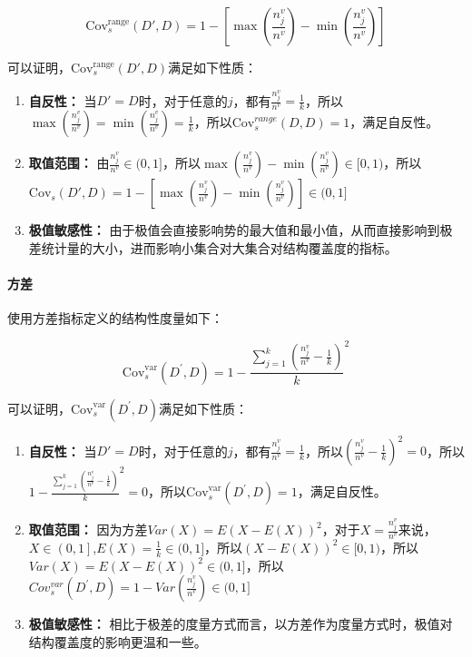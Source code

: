 \documentclass{../notes}
\newcommand{\Cov}{\text{Cov}}
\begin{document}
    \begin{equation}
        \Cov_s^{\text{range}}(D',D)=1-\left[\max\left(\frac{n_j^v}{n^v}\right)-\min\left(\frac{n_j^v}{n^v}\right)\right]
    \end{equation}

    可以证明，$\Cov_s^{\text{range}}(D',D)$满足如下性质：

    \begin{enumerate}
        \item \textbf{自反性：} 当$D' = D$时，对于任意的$j$，都有$\frac{n_j^v}{n^v}=\frac{1}{k}$，所以$\max{\left(\frac{n_j^v}{n^v}\right)}=\min(\frac{n_j^v}{n^v})=\frac{1}{k}$，所以$\Cov_s^{range}\left(D,D\right)=1$，满足自反性。
        \item \textbf{取值范围：} 由$\frac{n_j^v}{n^v}\in(0,1]$，所以$\max{\left(\frac{n_j^v}{n^v}\right)}-\min{\left(\frac{n_j^v}{n^v}\right)}\in[0,1)$，所以$\Cov_s(D',D)=1-\left[\max\left(\frac{n_j^v}{n^v}\right)-\min\left(\frac{n_j^v}{n^v}\right)\right]\in (0,1]$
        \item \textbf{极值敏感性：} 由于极值会直接影响势的最大值和最小值，从而直接影响到极差统计量的大小，进而影响小集合对大集合对结构覆盖度的指标。
    \end{enumerate}

    \paragraph*{方差}

    使用方差指标定义的结构性度量如下：

    \begin{equation}
        {\Cov_s^{\text{var}}\left(D^\prime,D\right)=1-\frac{\sum_{j=1}^{k}\left(\frac{n_j^v}{n^v}-\frac{1}{k}\right)}{k}}^2
    \end{equation}

    可以证明，$\Cov_s^{\text{var}}\left(D^\prime,D\right)$满足如下性质：

    \begin{enumerate}
        \item \textbf{自反性：} 当$D' = D$时，对于任意的$j$，都有$\frac{n_j^v}{n^v}=\frac{1}{k}$，所以$\left(\frac{n_j^v}{n^v}-\frac{1}{k}\right)^2=0$，所以${1-\frac{\sum_{j=1}^{k}\left(\frac{n_j^v}{n^v}-\frac{1}{k}\right)}{k}}^2=0$，所以$\Cov_s^{\text{var}}\left(D^\prime,D\right)=1$，满足自反性。
        \item \textbf{取值范围：} 因为方差$Var\left(X\right)=E(X-E\left(X\right))^2$，对于$X=\frac{n_j^v}{n^v}$来说，$X\in\left(0,1\right]$,$E\left(X\right)=\frac{1}{k}\in(0,1]$，所以$\left(X-E\left(X\right)\right)^2\in[0,1)$，所以$Var\left(X\right)=E(X-E\left(X\right))^2\in(0,1]$，所以$Cov_s^{var}\left(D^\prime,D\right)=1-Var\left(\frac{n_j^v}{n^v}\right)\in(0,1]$
        \item \textbf{极值敏感性：} 相比于极差的度量方式而言，以方差作为度量方式时，极值对结构覆盖度的影响更温和一些。
    \end{enumerate}
\end{document}
